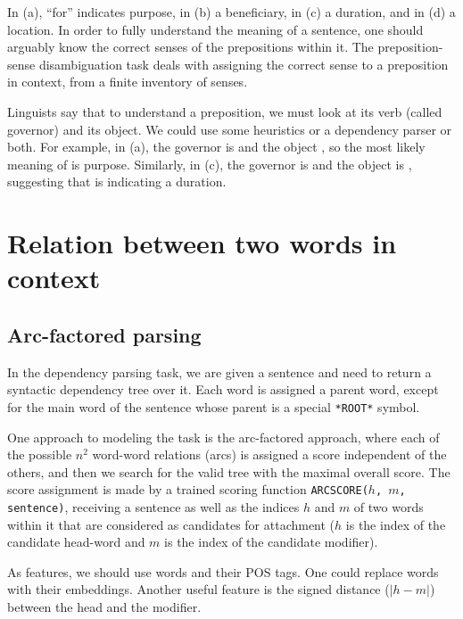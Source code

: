 In (a), ``for'' indicates purpose, in (b) a beneficiary, in (c) a duration, and in (d) a location. 
In order to fully understand the meaning of a sentence, one should arguably know the correct senses of the prepositions within it. 
The preposition-sense disambiguation task deals with assigning the correct sense to a preposition in context, from a finite inventory of senses.

Linguists say that to understand a preposition, we must look at its verb (called governor) and its object. We could use some heuristics or a dependency parser or both.
For example, in (a), the governor is  and the object , so the most likely meaning of  is purpose.
Similarly, in (c), the governor is  and the object is , suggesting that  is indicating a duration.

\section{Relation between two words in context}
\subsection{Arc-factored parsing}
In the dependency parsing task, we are given a sentence and need to return a syntactic dependency tree over it. Each word is assigned a parent word, except for the main word of the sentence whose parent is a special \texttt{*ROOT*} symbol.

One approach to modeling the task is the arc-factored approach, where each of the possible $n^{2}$ word-word relations (arcs) is assigned a score independent of the others, and then we search for the valid tree with the maximal overall score. The score assignment is made by a trained scoring function \texttt{ARCSCORE($h$, $m$, sentence)}, receiving a sentence as well as the indices $h$ and $m$ of two words within it that are considered as candidates for attachment ($h$ is the index of the candidate head-word and $m$ is the index of the candidate modifier).

As features, we should use words and their POS tags. One could replace words with their embeddings. Another useful feature is the signed distance ($|h - m|$) between the head and the modifier.

